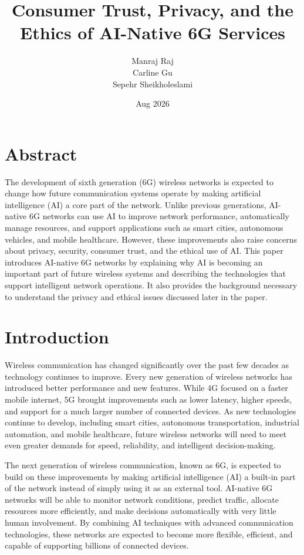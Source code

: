 \documentclass[letterpaper]{article}
\title{Consumer Trust, Privacy, and the Ethics of AI-Native 6G Services}
\author{
Manraj Raj\\
Carline Gu\\
Sepehr Sheikholeslami
}
\date{Aug 2026}
\begin{document}
\maketitle
\section{Abstract}
The development of sixth generation (6G) wireless networks is expected to change how future communication systems operate by making artificial intelligence (AI) a core part of the network. Unlike previous generations, AI-native 6G networks can use AI to improve network performance, automatically manage resources, and support applications such as smart cities, autonomous vehicles, and mobile healthcare. However, these improvements also raise concerns about privacy, security, consumer trust, and the ethical use of AI. This paper introduces AI-native 6G networks by explaining why AI is becoming an important part of future wireless systems and describing the technologies that support intelligent network operations. It also provides the background necessary to understand the privacy and ethical issues discussed later in the paper.

\section{Introduction}
Wireless communication has changed significantly over the past few decades as technology continues to improve. Every new generation of wireless networks has introduced better performance and new features. While 4G focused on a faster mobile internet, 5G brought improvements such as lower latency, higher speeds, and support for a much larger number of connected devices. As new technologies continue to develop, including smart cities, autonomous transportation, industrial automation, and mobile healthcare, future wireless networks will need to meet even greater demands for speed, reliability, and intelligent decision-making.

The next generation of wireless communication, known as 6G, is expected to build on these improvements by making artificial intelligence (AI) a built-in part of the network instead of simply using it as an external tool. AI-native 6G networks will be able to monitor network conditions, predict traffic, allocate resources more efficiently, and make decisions automatically with very little human involvement. By combining AI techniques with advanced communication technologies, these networks are expected to become more flexible, efficient, and capable of supporting billions of connected devices.
\end{document}
